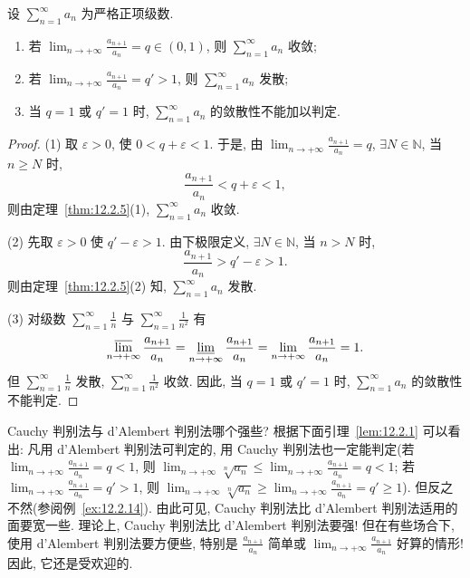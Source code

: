 \begin{theoremp}\label{thm:12.2.5p}
设 $\sum_{n=1}^{\infty}a_{n}$ 为严格正项级数.
\begin{enumerate}
  \item 若 $\lim_{n\to+\infty}\frac{a_{n+1}}{a_{n}}=q\in(0,1)$, 则 $\sum_{n=1}^{\infty}a_{n}$ 收敛;
  \item 若 $\lim_{n\to+\infty}\frac{a_{n+1}}{a_{n}}=q'>1$, 则 $\sum_{n=1}^{\infty}a_{n}$ 发散;
  \item 当 $q=1$ 或 $q'=1$ 时, $\sum_{n=1}^{\infty}a_{n}$ 的敛散性不能加以判定.
\end{enumerate}
\end{theoremp}

\begin{proof}
(1) 取 $\varepsilon>0$, 使 $0<q+\varepsilon<1$. 于是, 由 $\lim_{n\to+\infty}\frac{a_{n+1}}{a_{n}}=q$, $\exists N\in\mathbb{N}$, 当 $n\geqslant N$ 时,
\[
  \frac{a_{n+1}}{a_{n}}<q+\varepsilon<1,
\]
则由定理~\ref{thm:12.2.5}(1), $\sum_{n=1}^{\infty}a_{n}$ 收敛.

(2) 先取 $\varepsilon>0$ 使 $q'-\varepsilon>1$. 由下极限定义, $\exists N\in\mathbb{N}$, 当 $n>N$ 时,
\[
  \frac{a_{n+1}}{a_{n}}>q'-\varepsilon>1.
\]
则由定理~\ref{thm:12.2.5}(2) 知, $\sum_{n=1}^{\infty}a_{n}$ 发散.

(3) 对级数 $\sum_{n=1}^{\infty}\frac{1}{n}$ 与 $\sum_{n=1}^{\infty}\frac{1}{n^{2}}$ 有
\[
  \varlimsup_{n\to+\infty}\frac{a_{n+1}}{a_{n}}
  =\varliminf_{n\to+\infty}\frac{a_{n+1}}{a_{n}}
  =\lim_{n\to+\infty}\frac{a_{n+1}}{a_{n}}=1.
\]
但 $\sum_{n=1}^{\infty}\frac{1}{n}$ 发散, $\sum_{n=1}^{\infty}\frac{1}{n^{2}}$ 收敛. 因此, 当 $q=1$ 或 $q'=1$ 时, $\sum_{n=1}^{\infty}a_{n}$ 的敛散性不能判定.
\end{proof}

Cauchy 判别法与 d'Alembert 判别法哪个强些? 根据下面引理~\ref{lem:12.2.1} 可以看出: 凡用 d'Alembert 判别法可判定的, 用 Cauchy 判别法也一定能判定(若 $\lim_{n\to+\infty}\frac{a_{n+1}}{a_{n}}=q<1$, 则 $\lim_{n\to+\infty}\sqrt[n]{a_{n}}\leqslant\lim_{n\to+\infty}\frac{a_{n+1}}{a_{n}}=q<1$; 若 $\lim_{n\to+\infty}\frac{a_{n+1}}{a_{n}}=q'>1$, 则 $\lim_{n\to+\infty}\sqrt[n]{a_{n}}\geqslant\lim_{n\to+\infty}\frac{a_{n+1}}{a_{n}}=q'\geqslant1$). 但反之不然(参阅例~\ref{ex:12.2.14}). 由此可见, Cauchy 判别法比 d'Alembert 判别法适用的面要宽一些. 理论上, Cauchy 判别法比 d'Alembert 判别法要强! 但在有些场合下, 使用 d'Alembert 判别法要方便些, 特别是 $\frac{a_{n+1}}{a_{n}}$ 简单或 $\lim_{n\to+\infty}\frac{a_{n+1}}{a_{n}}$ 好算的情形! 因此, 它还是受欢迎的.

